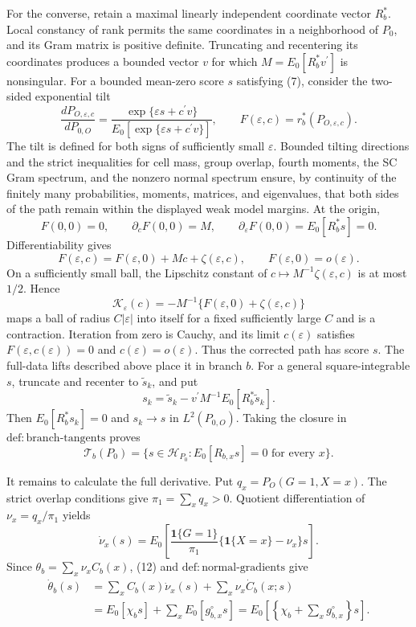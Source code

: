 For the converse, retain a maximal linearly independent coordinate vector \(R_b^*\).  Local constancy of rank permits the same coordinates in a neighborhood of \(P_0\), and its Gram matrix is positive definite.  Truncating and recentering its coordinates produces a bounded vector \(v\) for which \(M=E_0[R_b^*v^{\prime}]\) is nonsingular.  For a bounded mean-zero score \(s\) satisfying (7), consider the two-sided exponential tilt
\[
 \frac{dP_{O,\varepsilon,c}}{dP_{0,O}}
 =\frac{\exp\{\varepsilon s+c^{\prime}v\}}
 {E_0[\exp\{\varepsilon s+c^{\prime}v\}]},
 \qquad
 F(\varepsilon,c)=r_b^*(P_{O,\varepsilon,c}).
 \tag{8}
\]
The tilt is defined for both signs of sufficiently small \(\varepsilon\).  Bounded tilting directions and the strict inequalities for cell mass, group overlap, fourth moments, the SC Gram spectrum, and the nonzero normal spectrum ensure, by continuity of the finitely many probabilities, moments, matrices, and eigenvalues, that both sides of the path remain within the displayed weak model margins.  At the origin,
\[
 F(0,0)=0,
 \qquad
 \partial_cF(0,0)=M,
 \qquad
 \partial_{\varepsilon}F(0,0)=E_0[R_b^*s]=0.
 \tag{9}
\]
Differentiability gives
\[
 F(\varepsilon,c)=F(\varepsilon,0)+Mc+\zeta(\varepsilon,c),
 \qquad
 F(\varepsilon,0)=o(\varepsilon).
\]
On a sufficiently small ball, the Lipschitz constant of \(c\mapsto M^{-1}\zeta(\varepsilon,c)\) is at most \(1/2\).  Hence
\[
 \mathcal K_{\varepsilon}(c)
 =-M^{-1}\{F(\varepsilon,0)+\zeta(\varepsilon,c)\}
\]
maps a ball of radius \(C|\varepsilon|\) into itself for a fixed sufficiently large \(C\) and is a contraction.  Iteration from zero is Cauchy, and its limit \(c(\varepsilon)\) satisfies \(F(\varepsilon,c(\varepsilon))=0\) and \(c(\varepsilon)=o(\varepsilon)\).  Thus the corrected path has score \(s\).  The full-data lifts described above place it in branch \(b\).  For a general square-integrable \(s\), truncate and recenter to \(\widetilde s_k\), and put
\[
 s_k=\widetilde s_k-v^{\prime}M^{-1}E_0[R_b^*\widetilde s_k].
 \tag{10}
\]
Then \(E_0[R_b^*s_k]=0\) and \(s_k\to s\) in \(L^2(P_{0,O})\).  Taking the closure in \(\mathrm{def{:}branch\text{-}tangents}\) proves
\[
 \mathcal T_b(P_0)
 =\{s\in\mathcal H_{P_0}:E_0[R_{b,x}s]=0\text{ for every }x\}.
 \tag{11}
\]

It remains to calculate the full derivative.  Put \(q_x=P_O(G=1,X=x)\).  The strict overlap conditions give \(\pi_1=\sum_xq_x>0\).  Quotient differentiation of \(\nu_x=q_x/\pi_1\) yields
\[
 \dot\nu_x(s)
 =E_0\!\left[\frac{\mathbf 1\{G=1\}}{\pi_1}
 \{\mathbf 1\{X=x\}-\nu_x\}s\right].
 \tag{12}
\]
Since \(\theta_b=\sum_x\nu_xC_b(x)\), (12) and \(\mathrm{def{:}normal\text{-}gradients}\) give
\[
 \begin{aligned}
 \dot\theta_b(s)
 &=\sum_xC_b(x)\dot\nu_x(s)+\sum_x\nu_x\dot C_b(x;s)\\
 &=E_0[\chi_bs]+\sum_xE_0[g^{\circ}_{b,x}s]
 =E_0\!\left[\left\{\chi_b+\sum_xg^{\circ}_{b,x}\right\}s\right].
 \end{aligned}
 \tag{13}
\]

